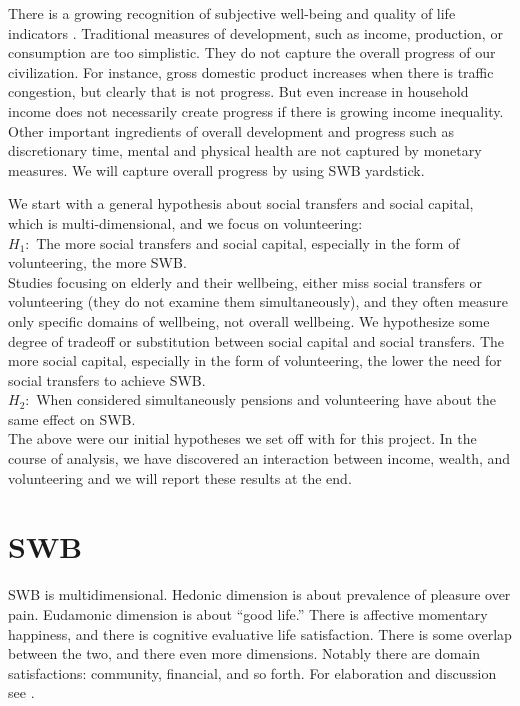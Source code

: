 \documentclass[10pt, letterpaper]{article}
\begin{document}
\begin{spacing}{1.4}
There is a growing recognition of subjective  well-being and quality of life
indicators \citep{aok_lsPol16}. Traditional
measures of development, such as income, production, or consumption are too
simplistic. They do not capture the overall progress of our civilization. For
instance, gross domestic product increases when there is traffic congestion, but
clearly that is not 
progress. But even increase in household income does not necessarily
 create progress if there is growing income inequality. 
Other important ingredients of overall development and progress such as
discretionary time, mental and physical health are not captured by monetary measures. We will
capture overall progress by using SWB yardstick.

%
 We start with a general hypothesis about social
 transfers and social capital, which is multi-dimensional, and we focus  on volunteering:\\
\noindent$H_1:$ The more social transfers and social capital, especially in the
form of volunteering, the more SWB.\\

Studies focusing on elderly and their wellbeing, either miss social
transfers or volunteering (they do not examine them simultaneously), and they
often measure only specific domains of wellbeing, not overall wellbeing. We
hypothesize some degree of tradeoff or substitution between social capital and
social transfers. The more social capital, especially in the form of volunteering,
the lower the need for social transfers to achieve SWB.\\ 

\noindent$H_2:$ When considered simultaneously pensions and volunteering have about the same effect on SWB.\\ 

The above were our initial hypotheses we set off with for this project. In the
course of analysis, we have discovered an interaction between income, wealth, and
volunteering and we will report these results at the end. 

\section{SWB} 

SWB is multidimensional. Hedonic dimension is about prevalence of pleasure over
pain. Eudamonic dimension is about ``good life.'' There is affective momentary
happiness, and there is cognitive evaluative life satisfaction. There is some
overlap between the two, and there even more dimensions. Notably there are domain satisfactions:
community, financial, and so forth. For elaboration and discussion see \citet{diener09,diener04s,veenhoven08,kahneman99,campbell76etal}.


\end{spacing}
\end{document}
